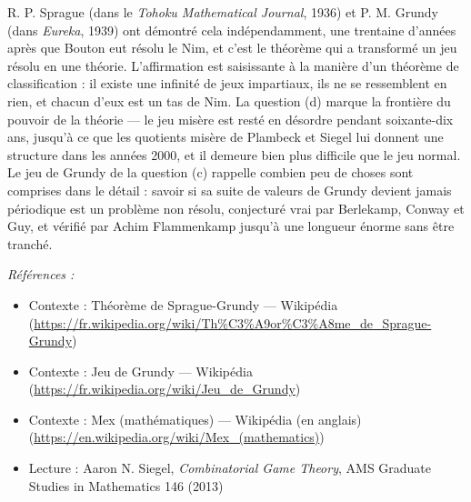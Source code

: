 \documentclass[11pt]{article}
\newenvironment{refs}{\par\small\noindent\emph{Références :}\begin{itemize}\setlength\itemsep{0pt}}{\end{itemize}\normalsize}
\begin{document}
\noindent R. P. Sprague (dans le \textit{Tohoku Mathematical Journal}, 1936) et
P. M. Grundy (dans \textit{Eureka}, 1939) ont démontré cela indépendamment, une trentaine
d'années après que Bouton eut résolu le Nim, et c'est le théorème qui a transformé un jeu
résolu en une théorie. L'affirmation est saisissante à la manière d'un théorème de
classification : il existe une infinité de jeux impartiaux, ils ne se ressemblent en rien,
et chacun d'eux est un tas de Nim. La question (d) marque la frontière du pouvoir de la
théorie --- le jeu misère est resté en désordre pendant soixante-dix ans, jusqu'à ce que les
quotients misère de Plambeck et Siegel lui donnent une structure dans les années 2000, et il
demeure bien plus difficile que le jeu normal. Le jeu de Grundy de la question (c) rappelle
combien peu de choses sont comprises dans le détail : savoir si sa suite de valeurs de Grundy
devient jamais périodique est un problème non résolu, conjecturé vrai par Berlekamp, Conway
et Guy, et vérifié par Achim Flammenkamp jusqu'à une longueur énorme sans être tranché.

\begin{refs}
\item Contexte : Théorème de Sprague-Grundy --- Wikipédia (\url{https://fr.wikipedia.org/wiki/Th%C3%A9or%C3%A8me_de_Sprague-Grundy})
\item Contexte : Jeu de Grundy --- Wikipédia (\url{https://fr.wikipedia.org/wiki/Jeu_de_Grundy})
\item Contexte : Mex (mathématiques) --- Wikipédia (en anglais) (\url{https://en.wikipedia.org/wiki/Mex_(mathematics)})
\item Lecture : Aaron N. Siegel, \textit{Combinatorial Game Theory}, AMS Graduate Studies in Mathematics 146 (2013)
\end{refs}

\bigskip
\end{document}
